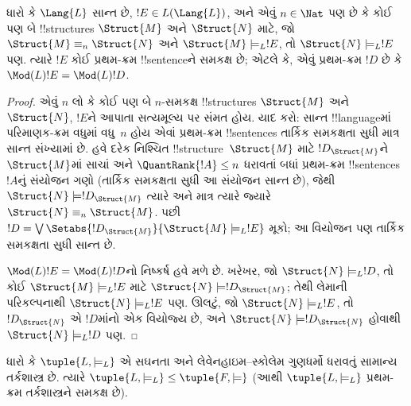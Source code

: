 \documentclass[../../../include/open-logic-section]{subfiles}
\begin{document}


\begin{lem}
ધારો કે $\Lang{L}$ સાન્ત છે, $!E \in L(\Lang{L})$, અને એવું
$n \in \Nat$ પણ છે કે કોઈ પણ બે !!{structure}s $\Struct{M}$ અને
$\Struct{N}$ માટે, જો $\Struct{M} \equiv_n \Struct{N}$ અને
$\Struct{M} \models_L !E$, તો $\Struct{N} \models_L !E$ પણ. ત્યારે
$!E$ કોઈ પ્રથમ-ક્રમ !!{sentence}ને સમકક્ષ છે; એટલે કે, એવું પ્રથમ-ક્રમ
$!D$ છે કે $\Mod(L){!E} = \Mod(L){!D}$.
\end{lem}

\begin{proof}
એવું $n$ લો કે કોઈ પણ બે $n$-સમકક્ષ !!{structure}s $\Struct{M}$ અને
$\Struct{N}$, $!E$ને આપાતા સત્યમૂલ્ય પર સંમત હોય.
 યાદ કરો: સાન્ત !!{language}માં
પરિમાણક-ક્રમ વધુમાં વધુ~$n$ હોય એવાં પ્રથમ-ક્રમ !!{sentence}s તાર્કિક
સમકક્ષતા સુધી માત્ર સાન્ત સંખ્યામાં છે. હવે દરેક નિશ્ચિત
!!{structure}~$\Struct{M}$ માટે $!D_{\Struct{M}}$ને $\Struct{M}$માં
સાચાં અને $\QuantRank{!A} \le n$ ધરાવતાં બધાં પ્રથમ-ક્રમ
!!{sentence}s~$!A$નું સંયોજન ગણો (તાર્કિક સમકક્ષતા સુધી આ સંયોજન
સાન્ત છે), જેથી $\Struct{N} \models !D_{\Struct{M}}$ ત્યારે અને માત્ર
ત્યારે જ્યારે $\Struct{N} \equiv_n \Struct{M}$. પછી
$!D = \textstyle\bigvee
\Setabs{!D_{\Struct{M}}}{\Struct{M} \models_L !E}$ મૂકો; આ વિયોજન પણ
તાર્કિક સમકક્ષતા સુધી સાન્ત છે.

$\Mod(L){!E} = \Mod(L){!D}$નો નિષ્કર્ષ હવે મળે છે. ખરેખર, જો
$\Struct{N} \models_L !D$, તો કોઈ $\Struct{M} \models_L !E$ માટે
$\Struct{N} \models !D_{\Struct{M}}$; તેથી લેમાની પરિકલ્પનાથી
$\Struct{N} \models_L !E$ પણ. ઊલટું, જો $\Struct{N} \models_L !E$,
તો $!D_\Struct{N}$ એ $!D$માંનો એક વિયોજ્ય છે, અને $\Struct{N}
\models !D_\Struct{N}$ હોવાથી $\Struct{N} \models_L !D$ પણ.
\end{proof}

\begin{thm}[લિન્ડસ્ટ્રોમનું પ્રમેય]
   ધારો કે $\tuple{L, \models_L}$ એ સઘનતા અને
  લેવેનહાઇમ--સ્કોલેમ ગુણધર્મો ધરાવતું સામાન્ય તર્કશાસ્ત્ર છે. ત્યારે
  $\tuple{L, \models_L} \le \tuple{F, \models}$ (આથી
  $\tuple{L, \models_L}$ પ્રથમ-ક્રમ તર્કશાસ્ત્રને સમકક્ષ છે).
\end{thm}
\end{document}
